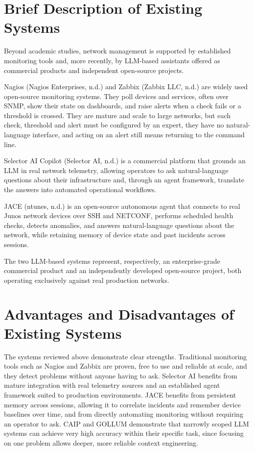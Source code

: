 \section{Brief Description of Existing Systems}

Beyond academic studies, network management is supported by established
monitoring tools and, more recently, by LLM-based assistants offered as
commercial products and independent open-source projects.

Nagios (Nagios Enterprises, n.d.) and Zabbix (Zabbix LLC, n.d.) are widely
used open-source monitoring systems. They poll devices and services, often
over SNMP, show their state on dashboards, and raise alerts when a check
fails or a threshold is crossed. They are mature and scale to large networks,
but each check, threshold and alert must be configured by an expert, they
have no natural-language interface, and acting on an alert still means
returning to the command line.

Selector AI Copilot (Selector AI, n.d.) is a commercial platform that
grounds an LLM in real network telemetry, allowing operators to ask natural-language questions about
their infrastructure and, through an agent framework, translate the answers
into automated operational workflows.

JACE (ntunes, n.d.) is an open-source autonomous agent that connects to
real Junos network devices over SSH and NETCONF, performs scheduled health checks, detects
anomalies, and answers natural-language questions about the network, while
retaining memory of device state and past incidents across sessions.

The two LLM-based systems represent, respectively, an enterprise-grade
commercial product and an independently developed open-source project, both
operating exclusively against real production networks.

\section{Advantages and Disadvantages of Existing Systems}

The systems reviewed above demonstrate clear strengths. Traditional
monitoring tools such as Nagios and Zabbix are proven, free to use and
reliable at scale, and they detect problems without anyone having to ask.
Selector AI benefits
from mature integration with real telemetry sources and an established agent
framework suited to production environments. JACE benefits from persistent
memory across sessions, allowing it to correlate incidents and remember
device baselines over time, and from directly automating monitoring without
requiring an operator to ask. CAIP and GOLLUM demonstrate that narrowly scoped
LLM systems can achieve very high accuracy within their specific task, since
focusing on one problem allows deeper, more reliable context engineering.


